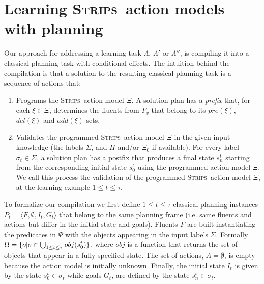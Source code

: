 \documentclass[letterpaper]{article} %
\newcommand{\tup}[1]{{\langle #1 \rangle}}
\newcommand{\strips}{\textsc{Strips}}     %
\begin{document}
\section{Learning \strips\ action models with planning}
Our approach for addressing a learning task $\Lambda$, $\Lambda'$ or $\Lambda''$, is compiling it into a classical planning task with conditional effects. The intuition behind the compilation is that a solution to the resulting classical planning task is a sequence of actions that:
\begin{enumerate}
\item Programs the \strips\ action model $\Xi$. A solution plan has a {\em prefix} that, for each $\xi\in\Xi$, determines the fluents from $F_v$ that belong to its $pre(\xi)$, $del(\xi)$ and $add(\xi)$ sets.
\item Validates the programmed \strips\ action model $\Xi$ in the given input knowledge (the labels $\Sigma$, and $\Pi$ and/or $\Xi_0$ if available). For every label $\sigma_t\in \Sigma$, a solution plan has a postfix that produces a final state $s_{n}^t$ starting from the corresponding initial state $s_0^t$ using the programmed action model $\Xi$. We call this process the validation of the programmed \strips\ action model $\Xi$, at the learning example {\small $1\leq t\leq \tau$}. %
\end{enumerate}

To formalize our compilation we first define {\small $1\leq t\leq \tau$} classical planning instances $P_t=\tup{F,\emptyset,I_t,G_t}$ that belong to the same planning frame (i.e. same fluents and actions but differ in the initial state and goals). Fluents $F$ are built instantiating the predicates in $\Psi$ with the objects appearing in the input labels $\Sigma$. Formally $\Omega=\{o|o\in \bigcup_{\small 1\leq t\leq \tau} obj(s_0^t)\}$, where $obj$ is a function that returns the set of objects that appear in a fully specified state. The set of actions, $A=\emptyset$, is empty because the action model is initially unknown. Finally, the initial state $I_t$ is given by the state $s_0^t\in \sigma_t$ while goals $G_t$, are defined by the state $s_n^t\in \sigma_t$.
\end{document}
